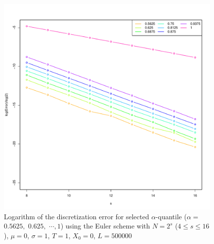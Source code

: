 \documentclass[cjk,10pt]{beamer}
\begin{document}
\begin{frame}
\begin{figure}
   \centering
   \includegraphics[scale=0.3]{nout_0log.pdf} %
   \caption{Logarithm of the discretization error for selected $\alpha$-quantile ($\alpha =$ $0.5625,$ $0.625,$ 
   $\cdots, 1$) using the Euler scheme with $N = 2^s$ ($4\le s \le 16$), $\mu=0$, $\sigma=1$, $T=1$, $X_0=0$, $L=500000$}
   \label{f:lerr}
\end{figure}
\end{frame}
\end{document}
